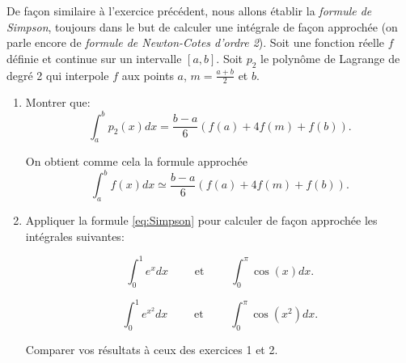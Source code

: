 \begin{exercice}

De façon similaire à l'exercice précédent, nous allons établir la \emph{formule de Simpson}, toujours dans le but de calculer une intégrale de façon approchée (on parle encore de \emph{formule de Newton-Cotes d'ordre 2}). Soit une fonction réelle $f$ définie et continue sur un intervalle $[a,b]$. Soit $p_2$ le polynôme de Lagrange de degré 2 qui interpole $f$ aux points $a$, $m=\frac{a+b}2$ et $b$.

\begin{enumerate}

\item Montrer que:
\[
\int_a^b p_2(x) dx = \frac{b-a}6 ( f(a) + 4f(m) + f(b) ).
\]

On obtient comme cela la formule approchée 
\begin{equation} \label{eq:Simpson}
\int_a^b f(x) dx \simeq \frac{b-a}6 ( f(a) + 4f(m) + f(b) ).
\end{equation}

\item Appliquer la formule \eqref{eq:Simpson} pour calculer de façon approchée les intégrales suivantes:

$$ \int_0^1 e^x dx \qquad \mbox{ et } \qquad \int_0^\pi \cos(x) dx.$$

$$ \int_0^1 e^{x^2} dx \qquad \mbox{ et } \qquad \int_0^\pi \cos(x^2) dx.$$

Comparer vos résultats à ceux des exercices 1 et 2.

\end{enumerate}

\end{exercice}

\medskip

